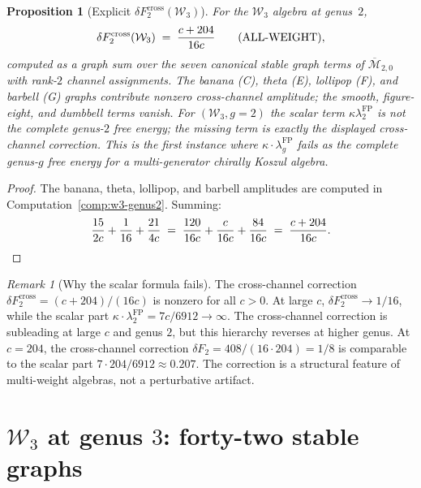 \documentclass[11pt]{article}
\newtheorem{proposition}[theorem]{Proposition}
\theoremstyle{definition}
\theoremstyle{remark}
\newtheorem{remark}[theorem]{Remark}
\newcommand{\cM}{\mathcal{M}}
\newcommand{\Walg}{\mathcal{W}}
\newcommand{\FP}{\mathrm{FP}}
\newcommand{\cross}{\mathrm{cross}}
\numberwithin{equation}{section}
\begin{document}
\begin{proposition}[Explicit $\delta F_2^{\cross}(\Walg_3)$]
\label{prop:delta-f-cross-w3-g2}
For the $\Walg_3$ algebra at genus~$2$,
\[
 \delta F_2^{\cross}(\Walg_3)
 \;=\;
 \frac{c + 204}{16c}
 \qquad\text{\textup{(}ALL-WEIGHT\textup{)}},
\]
computed as a graph sum over the seven canonical stable graph terms of
$\overline{\cM}_{2,0}$ with rank-$2$ channel assignments.
The banana (C), theta (E), lollipop (F), and barbell (G) graphs
contribute nonzero cross-channel amplitude; the smooth, figure-eight,
and dumbbell terms vanish.
For $(\Walg_3,g=2)$ the scalar term
$\kappa\lambda_2^{\FP}$ is not the complete genus-$2$ free energy;
the missing term is exactly the displayed cross-channel correction.
This is the first instance where
$\kappa \cdot \lambda_g^{\mathrm{FP}}$ fails as the complete
genus-$g$ free energy for a multi-generator chirally Koszul
algebra.
\end{proposition}

\begin{proof}
The banana, theta, lollipop, and barbell amplitudes are computed
in Computation~\ref{comp:w3-genus2}. Summing:
\[
 \frac{15}{2c} + \frac{1}{16} + \frac{21}{4c}
 \;=\;
 \frac{120}{16c} + \frac{c}{16c} + \frac{84}{16c}
 \;=\;
 \frac{c + 204}{16c}. \qedhere
\]
\end{proof}

\begin{remark}[Why the scalar formula fails]\label{rem:why-scalar-fails}
The cross-channel correction $\delta F_2^{\cross} = (c{+}204)/(16c)$
is nonzero for all $c > 0$.
At large $c$, $\delta F_2^{\cross} \to 1/16$, while the scalar
part $\kappa \cdot \lambda_2^{\FP} = 7c/6912 \to \infty$.
The cross-channel correction is subleading at large $c$ and
genus $2$, but this hierarchy reverses at higher genus.
At $c = 204$, the cross-channel correction
$\delta F_2 = 408/(16 \cdot 204) = 1/8$ is comparable to the
scalar part $7 \cdot 204/6912 \approx 0.207$.
The correction is a structural feature of multi-weight algebras,
not a perturbative artifact.
\end{remark}


\section{$\Walg_3$ at genus $3$: forty-two stable graphs}
\label{sec:w3-genus3}
\end{document}
